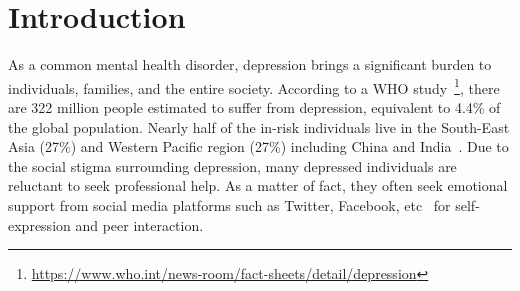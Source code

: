 \section{Introduction}
\label{sec:intro}
As a common mental health disorder, depression brings a significant burden to individuals, families, and the entire society. According to a WHO study~\footnote{\url{https://www.who.int/news-room/fact-sheets/detail/depression}}, there are 322 million people estimated to suffer from depression, equivalent to 4.4\% of the global population. Nearly half of the in-risk individuals live in the South-East Asia (27\%) and Western Pacific region (27\%) including China and India~\cite{tadesse2019detection}.
Due to the social stigma surrounding depression, many depressed individuals are reluctant to seek professional help. As a matter of fact, they often seek emotional support from social media platforms such as Twitter, Facebook, etc~\cite{lau2020android, park2013perception} for self-expression and peer interaction. 

